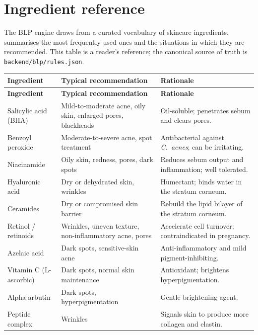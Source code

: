 \documentclass[11pt,a4paper,oneside]{report}
\begin{document}
\chapter{Ingredient reference}

The BLP engine draws from a curated vocabulary of skincare
ingredients.  summarises the most
frequently used ones and the situations in which they are
recommended. This table is a reader's reference; the canonical
source of truth is \texttt{backend/blp/rules.json}.

\begin{longtable}{@{}p{3.9cm}p{4.3cm}p{5.7cm}@{}}
    \toprule
    \textbf{Ingredient} & \textbf{Typical recommendation} & \textbf{Rationale} \\
    \midrule
    \endfirsthead
    \toprule
    \textbf{Ingredient} & \textbf{Typical recommendation} & \textbf{Rationale} \\
    \midrule
    \endhead
    Salicylic acid (BHA)      & Mild-to-moderate acne, oily skin, enlarged pores, blackheads & Oil-soluble; penetrates sebum and clears pores. \\
    Benzoyl peroxide          & Moderate-to-severe acne, spot treatment          & Antibacterial against \emph{C.\ acnes}; can be irritating. \\
    Niacinamide               & Oily skin, redness, pores, dark spots            & Reduces sebum output and inflammation; well tolerated. \\
    Hyaluronic acid           & Dry or dehydrated skin, wrinkles                 & Humectant; binds water in the stratum corneum. \\
    Ceramides                 & Dry or compromised skin barrier                  & Rebuild the lipid bilayer of the stratum corneum. \\
    Retinol / retinoids       & Wrinkles, uneven texture, non-inflammatory acne, pores & Accelerate cell turnover; contraindicated in pregnancy. \\
    Azelaic acid              & Dark spots, sensitive-skin acne                  & Anti-inflammatory and mild pigment-inhibiting. \\
    Vitamin C (L-ascorbic)    & Dark spots, normal skin maintenance              & Antioxidant; brightens hyperpigmentation. \\
    Alpha arbutin             & Dark spots, hyperpigmentation                    & Gentle brightening agent. \\
    Peptide complex           & Wrinkles                                          & Signals skin to produce more collagen and elastin. \\

\end{longtable}
\end{document}
